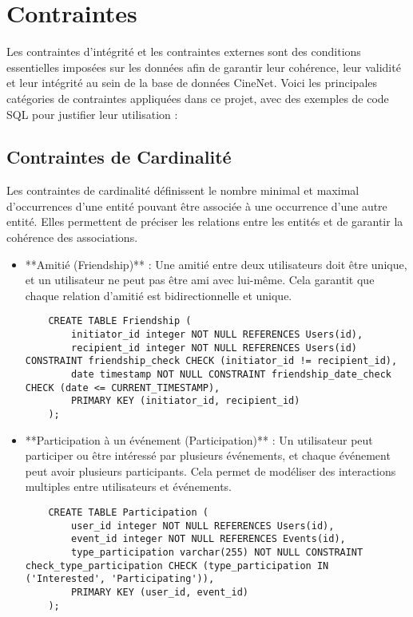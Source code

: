 \section{Contraintes}

Les contraintes d'intégrité et les contraintes externes sont des conditions essentielles imposées sur les données afin de garantir leur cohérence, leur validité et leur intégrité au sein de la base de données CineNet. Voici les principales catégories de contraintes appliquées dans ce projet, avec des exemples de code SQL pour justifier leur utilisation :

\subsection{Contraintes de Cardinalité}

Les contraintes de cardinalité définissent le nombre minimal et maximal d'occurrences d'une entité pouvant être associée à une occurrence d'une autre entité. Elles permettent de préciser les relations entre les entités et de garantir la cohérence des associations.

\begin{itemize}
    \item **Amitié (Friendship)** : Une amitié entre deux utilisateurs doit être unique, et un utilisateur ne peut pas être ami avec lui-même. Cela garantit que chaque relation d'amitié est bidirectionnelle et unique.
    \begin{lstlisting}
    CREATE TABLE Friendship (
        initiator_id integer NOT NULL REFERENCES Users(id),
        recipient_id integer NOT NULL REFERENCES Users(id) CONSTRAINT friendship_check CHECK (initiator_id != recipient_id),
        date timestamp NOT NULL CONSTRAINT friendship_date_check CHECK (date <= CURRENT_TIMESTAMP),
        PRIMARY KEY (initiator_id, recipient_id)
    );
    \end{lstlisting}
    \item **Participation à un événement (Participation)** : Un utilisateur peut participer ou être intéressé par plusieurs événements, et chaque événement peut avoir plusieurs participants. Cela permet de modéliser des interactions multiples entre utilisateurs et événements.
    \begin{lstlisting}
    CREATE TABLE Participation (
        user_id integer NOT NULL REFERENCES Users(id),
        event_id integer NOT NULL REFERENCES Events(id),
        type_participation varchar(255) NOT NULL CONSTRAINT check_type_participation CHECK (type_participation IN ('Interested', 'Participating')),
        PRIMARY KEY (user_id, event_id)
    );
    \end{lstlisting}
\end{itemize}

